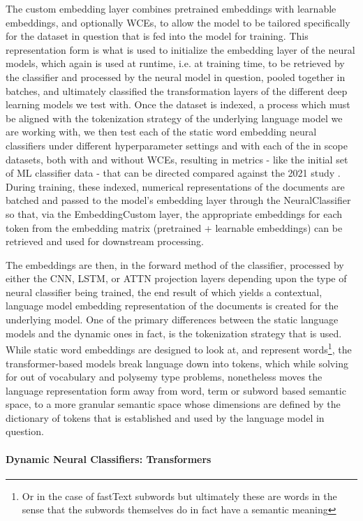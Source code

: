 \documentclass[final]{clv2025-revised}
\begin{document}
The custom embedding layer combines pretrained embeddings with learnable embeddings, and optionally WCEs, to allow the model to be tailored specifically for the dataset in question that is fed into the model for training. This representation form is what is used to initialize the embedding layer of the neural models, which again is used at runtime, i.e. at training time, to be retrieved by the classifier and processed by the neural model in question, pooled together in batches, and ultimately classified the transformation layers of the different deep learning models we test with. Once the dataset is indexed, a process which must be aligned with the tokenization strategy of the underlying language model we are working with, we then test each of the static word embedding neural classifiers under different hyperparameter settings and with each of the in scope datasets, both with and without WCEs, resulting in metrics - like the initial set of ML classifier data - that can be directed compared against the 2021 study \cite{moreo2021}. During training, these indexed, numerical representations of the documents are batched and passed to the model's embedding layer through the NeuralClassifier so that, via the EmbeddingCustom layer, the appropriate embeddings for each token from the embedding matrix (pretrained + learnable embeddings) can be retrieved and used for downstream processing. 

The embeddings are then, in the forward method of the classifier, processed by either the CNN, LSTM, or ATTN projection layers depending upon the type of neural classifier being trained, the end result of which yields a contextual, language model embedding representation of the documents is created for the underlying model. One of the primary differences between the static language models and the dynamic ones in fact, is the tokenization strategy that is used. While static word embeddings are designed to look at, and represent words\footnote{Or in the case of fastText subwords but ultimately these are words in the sense that the subwords themselves do in fact have a semantic meaning}, the transformer-based models break language down into tokens, which while solving for out of vocabulary and polysemy type problems, nonetheless moves the language representation form away from word, term or subword based semantic space, to a more granular semantic space whose dimensions are defined by the dictionary of tokens that is established and used by the language model in question.

\paragraph{Dynamic Neural Classifiers: Transformers}
\end{document}
